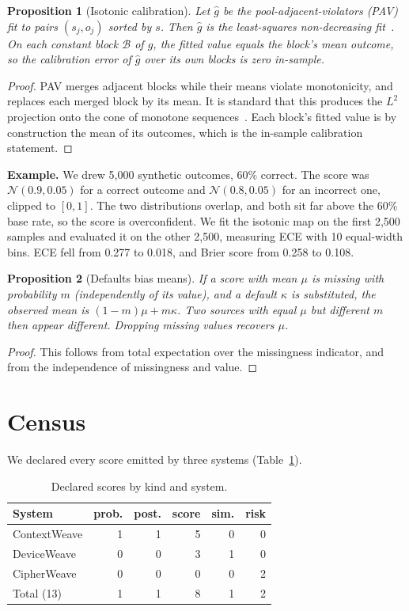 \documentclass[conference]{IEEEtran}
\newtheorem{proposition}{Proposition}
\begin{document}
\begin{proposition}[Isotonic calibration]\label{prop:iso}
Let $\hat g$ be the pool-adjacent-violators (PAV) fit to pairs $(s_j,o_j)$ sorted by $s$. Then $\hat g$ is the least-squares non-decreasing fit~\cite{barlow1972}. On each constant block $\mathcal B$ of $\hat g$, the fitted value equals the block's mean outcome, so the calibration error of $\hat g$ over its own blocks is zero in-sample.
\end{proposition}
\begin{proof}
PAV merges adjacent blocks while their means violate monotonicity, and replaces each merged block by its mean. It is standard that this produces the $L^2$ projection onto the cone of monotone sequences~\cite{barlow1972}. Each block's fitted value is by construction the mean of its outcomes, which is the in-sample calibration statement.
\end{proof}
\textbf{Example.} We drew 5{,}000 synthetic outcomes, 60\% correct. The score was $\mathcal N(0.9,0.05)$ for a correct outcome and $\mathcal N(0.8,0.05)$ for an incorrect one, clipped to $[0,1]$. The two distributions overlap, and both sit far above the 60\% base rate, so the score is overconfident. We fit the isotonic map on the first 2{,}500 samples and evaluated it on the other 2{,}500, measuring ECE with 10 equal-width bins. ECE fell from 0.277 to 0.018, and Brier score from 0.258 to 0.108.

\begin{proposition}[Defaults bias means]\label{prop:default}
If a score with mean $\mu$ is missing with probability $m$ (independently of its value), and a default $\kappa$ is substituted, the observed mean is $(1-m)\mu+m\kappa$. Two sources with equal $\mu$ but different $m$ then appear different. Dropping missing values recovers $\mu$.
\end{proposition}
\begin{proof}
This follows from total expectation over the missingness indicator, and from the independence of missingness and value.
\end{proof}

\section{Census}
We declared every score emitted by three systems (Table~\ref{tab:census}).

\begin{table}[t]
\centering
\caption{Declared scores by kind and system.}
\label{tab:census}
\begin{tabular}{lrrrrr}
\toprule
System & prob. & post. & score & sim. & risk\\
\midrule
ContextWeave & 1 & 1 & 5 & 0 & 0\\
DeviceWeave & 0 & 0 & 3 & 1 & 0\\
CipherWeave & 0 & 0 & 0 & 0 & 2\\
\midrule
Total (13) & 1 & 1 & 8 & 1 & 2\\
\bottomrule
\end{tabular}
\end{table}
\end{document}
